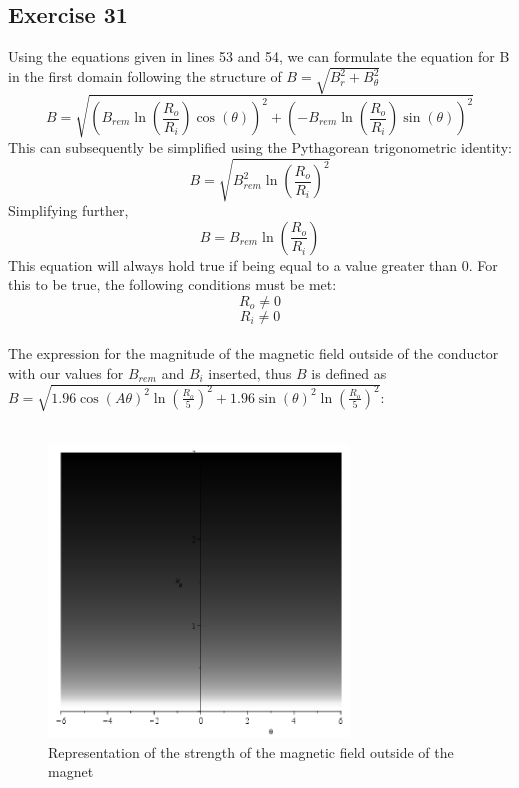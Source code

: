 \documentclass{article}
\begin{document}
\subsection{Exercise 31}
Using the equations given in lines 53 and 54, we can formulate the equation for B in the first domain following the structure of $B = \sqrt{B^2_r + B^2_\theta}$
\\
\begin{equation}
    B=\sqrt{\left(B_{\mathit{rem}}\ln\left(\frac{R_{o}}{R_{i}}\right)\cos\left(\theta\right)\right)^{2}+\left(-B_{\mathit{rem}}\ln\left(\frac{R_{o}}{R_{i}}\right)\sin\left(\theta\right)\right)^{2}}
\end{equation}
This can subsequently be simplified using the Pythagorean trigonometric identity:
\begin{equation}
    B=\sqrt{B_{\mathit{rem}}^{2}\ln\left(\frac{R_{o}}{R_{i}}\right)^{2}}   
\end{equation}
Simplifying further,
\begin{equation}
   B=B_{\mathit{rem}}^{}\ln\left(\frac{R_{o}}{R_{i}}\right)
\end{equation}
This equation will always hold true if being equal to a value greater than 0. For this to be true, the following conditions must be met:
\begin{equation}
    R_{o}\neq 0
\end{equation}
\begin{equation}
    R_{i}\neq0
\end{equation}
\\
The expression for the magnitude of the magnetic field outside of the conductor with our values for $B_{rem}$ and $B_i$ inserted, thus $B$ is defined as $B = \sqrt{ 1.96 \cos \left(A\theta\right)^{2} \ln \left(\frac{R_{o}}{5}\right)^{2}+ 1.96 \sin \left(\theta\right)^{2} \ln \left(\frac{R_{o}}{5}\right)^{2}}\colon$
\\
\\
\begin{figure}[h!]
\includegraphics[width=8cm]{exercise31__1.PNG}
\centering
\caption{Representation of the strength of the magnetic field outside of the magnet}
\end{figure}
\end{document}
